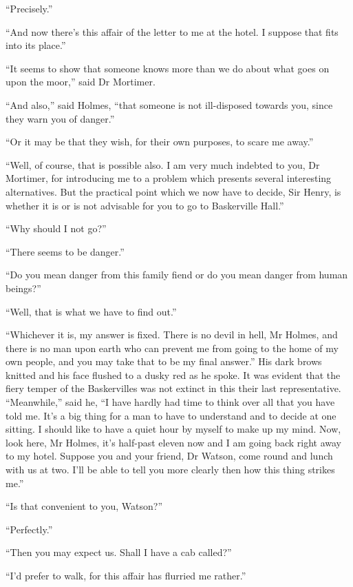 \documentclass[paper=5.5in:8.5in,BCOR=7mm,twoside,DIV=calc,12pt,usegeometry,openany,chapterprefix,endperiod,headings=big]{scrbook} %
\begin{document}
\enquote{Precisely.}

\enquote{And now there's this affair of the letter to me at the hotel. I suppose that fits into its place.}

\enquote{It seems to show that someone knows more than we do about what goes on upon the moor,} said Dr Mortimer.

\enquote{And also,} said Holmes, \enquote{that someone is not ill-disposed towards you, since they warn you of danger.}

\enquote{Or it may be that they wish, for their own purposes, to scare me away.}

\enquote{Well, of course, that is possible also. I am very much indebted to you, Dr Mortimer, for introducing me to a problem which presents several interesting alternatives. But the practical point which we now have to decide, Sir Henry, is whether it is or is not advisable for you to go to Baskerville Hall.}

\enquote{Why should I not go?}

\enquote{There seems to be danger.}

\enquote{Do you mean danger from this family fiend or do you mean danger from human beings?}

\enquote{Well, that is what we have to find out.}

\enquote{Whichever it is, my answer is fixed. There is no devil in hell, Mr Holmes, and there is no man upon earth who can prevent me from going to the home of my own people, and you may take that to be my final answer.} His dark brows knitted and his face flushed to a dusky red as he spoke. It was evident that the fiery temper of the Baskervilles was not extinct in this their last representative. \enquote{Meanwhile,} said he, \enquote{I have hardly had time to think over all that you have told me. It's a big thing for a man to have to understand and to decide at one sitting. I should like to have a quiet hour by myself to make up my mind. Now, look here, Mr Holmes, it's half-past eleven now and I am going back right away to my hotel. Suppose you and your friend, Dr Watson, come round and lunch with us at two. I'll be able to tell you more clearly then how this thing strikes me.}

\enquote{Is that convenient to you, Watson?}

\enquote{Perfectly.}

\enquote{Then you may expect us. Shall I have a cab called?}

\enquote{I'd prefer to walk, for this affair has flurried me rather.}
\end{document}
